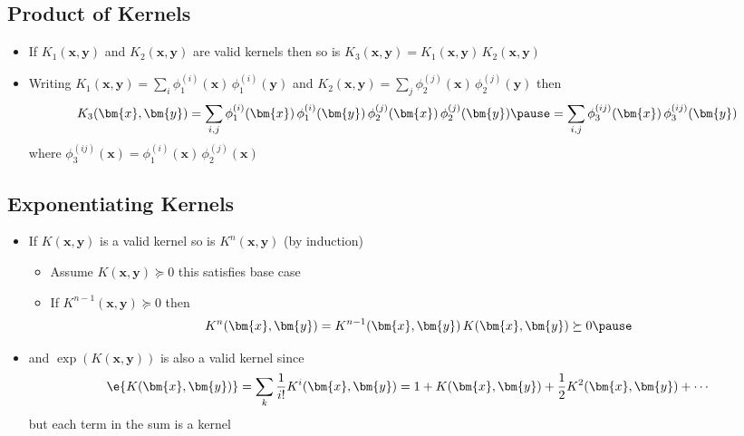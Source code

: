 \begin{slide}
\section{Product of Kernels}

\begin{PauseHighLight}
  \begin{itemize}
  \item If $K_1(\bm{x}, \bm{y})$ and  $K_2(\bm{x}, \bm{y})$ are valid
    kernels then so is $K_3(\bm{x}, \bm{y}) = K_1(\bm{x}, \bm{y})\,
    K_2(\bm{x}, \bm{y})$\pause
  \item Writing $K_1(\bm{x}, \bm{y}) = \sum_i \phi^{(i)}_1(\bm{x})\,
    \phi^{(i)}_1(\bm{y})$ and $K_2(\bm{x}, \bm{y}) = \sum_j \phi^{(j)}_2(\bm{x})\,
    \phi^{(j)}_2(\bm{y})$ then
    \begin{align*}
      K_3(\bm{x}, \bm{y})
      = \sum_{i,j} \phi^{(i)}_1(\bm{x})\,\phi^{(i)}_1(\bm{y})\,
      \phi^{(j)}_2(\bm{x})\,\phi^{(j)}_2(\bm{y}) \pause
      = \sum_{i,j} \phi^{(ij)}_3(\bm{x})\,
      \phi^{(ij)}_3(\bm{y})
    \end{align*}
    where $\phi^{(ij)}_3(\bm{x}) = \phi^{(i)}_1(\bm{x})\,\phi^{(j)}_2(\bm{x})$\pauseb
  \end{itemize}
\end{PauseHighLight}

\end{slide}


\begin{slide}
\section{Exponentiating Kernels}

\begin{PauseHighLight}
  \begin{itemize}
  \item If $K(\bm{x}, \bm{y})$ is a valid kernel so is 
    $K^n(\bm{x}, \bm{y})$ (by induction)\pause
    \begin{itemize}\squeeze
    \item Assume $K(\bm{x}, \bm{y}) \succeq 0$ this satisfies base case\pause
    \item If $K^{n-1} (\bm{x}, \bm{y})\succeq 0$ then
      \begin{align*}
        K^{n}(\bm{x}, \bm{y}) = K^{n-1} (\bm{x}, \bm{y}) \, K(\bm{x}, \bm{y})\succeq 0\pause
      \end{align*}
    \end{itemize}
  \item and $\exp(K(\bm{x}, \bm{y}))$ is also a valid kernel since
    \begin{align*}
      \e{K(\bm{x}, \bm{y})} = \sum_k \frac{1}{i!} K^i(\bm{x}, \bm{y})
      = 1 + K(\bm{x}, \bm{y}) + \frac{1}{2} K^2(\bm{x}, \bm{y}) + \cdots
    \end{align*}
    but each term in the sum is a kernel\pause
  \end{itemize}
\end{PauseHighLight}

\end{slide}

